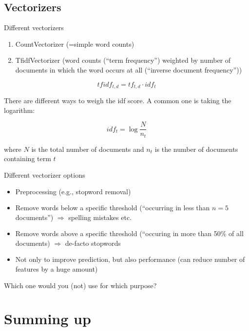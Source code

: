 \subsection{Vectorizers}

\begin{frame}{Different vectorizers}
  \begin{enumerate}[<+->]
  \item CountVectorizer (=simple word counts)
  \item TfidfVectorizer (word counts (``term frequency'') weighted by number of documents in which the word occurs at all (``inverse document frequency''))
  \end{enumerate}
  
	\pause
	$$tfidf_{t,d} = tf_{t,d} \cdot idf_{t}$$
	
	There are different ways to weigh the idf score. A common one is taking the logarithm:
	
	$$idf_{t} = \log \frac{N}{n_t}$$
	
	where $N$ is the total number of documents and $n_t$ is the number of documents containing term $t$
\end{frame}

\begin{frame}{Different vectorizer options}
  \begin{itemize}
  \item Preprocessing (e.g., stopword removal)
  \item Remove words below a specific threshold (``occurring in less than $n=5$ documents'') $\Rightarrow$ spelling mistakes etc.
  \item Remove words above a specific threshold (``occuring in more than 50\% of all documents) $\Rightarrow$ de-facto stopwords
  \item Not only to improve prediction, but also performance (can reduce number of features by a huge amount)
  \end{itemize}
\end{frame}








\begin{frame}{Which one would you (not) use for which purpose?}
\end{frame}




\section{Summing up}

